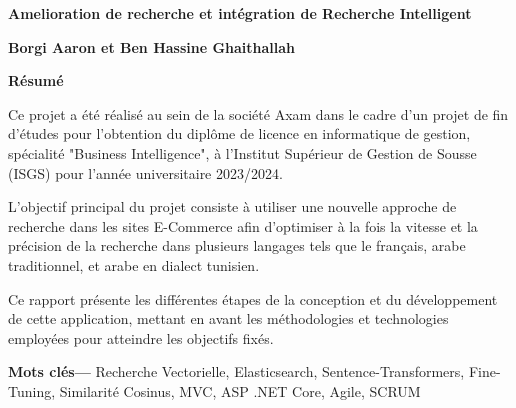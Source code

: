 \providecommand{\motscles}[1]
{
  \large
  \textbf{Mots clés---} #1
}

\thispagestyle{plain}
\begin{center}
    \Large
    \textbf{Amelioration de recherche et intégration de Recherche Intelligent}
        
    \vspace{0.4cm}
    \textbf{Borgi Aaron et Ben Hassine Ghaithallah}
       
    \vspace{0.9cm}
    \textbf{Résumé}
\end{center}
Ce projet a été réalisé au sein de la société Axam dans le cadre d'un projet de fin d'études pour l'obtention du diplôme de licence en informatique de gestion, spécialité "Business
Intelligence", à l'Institut Supérieur de Gestion de Sousse (ISGS) pour l'année universitaire
2023/2024.

\vspace*{0.5cm}
\noindent
L'objectif principal du projet consiste à utiliser une nouvelle approche de recherche dans les sites E-Commerce afin d'optimiser à la fois la vitesse et la précision de la recherche dans plusieurs langages tels que le français, arabe traditionnel, et arabe en dialect tunisien.

\vspace*{0.5cm}
\noindent
Ce rapport présente les différentes étapes de la conception et du développement de cette
application, mettant en avant les méthodologies et technologies employées pour atteindre les
objectifs fixés.

\noindent
\motscles{Recherche Vectorielle, Elasticsearch, Sentence-Transformers, Fine-Tuning, Similarité Cosinus, MVC, ASP .NET Core, Agile, SCRUM}